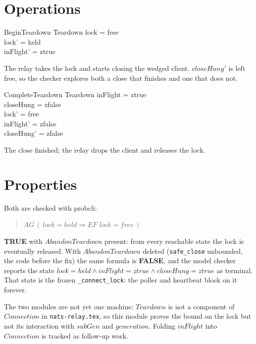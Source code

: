 \documentclass[a4paper,10pt,fleqn]{article}
\begin{document}
\section{Operations}

\begin{schema}{BeginTeardown}
  \Delta Teardown
  \where
  lock = free \\
  lock' = held \\
  inFlight' = ztrue
\end{schema}

The relay takes the lock and starts closing the wedged client.
$closeHung'$ is left free, so the checker explores both a close that
finishes and one that does not.

\begin{schema}{CompleteTeardown}
  \Delta Teardown
  \where
  inFlight = ztrue \\
  closeHung = zfalse \\
  lock' = free \\
  inFlight' = zfalse \\
  closeHung' = zfalse
\end{schema}

The close finished; the relay drops the client and releases the lock.

\section{Properties}

Both are checked with probcli:

\begin{quote}
  $AG\,(\,lock = held \Rightarrow EF\;lock = free\,)$
\end{quote}

\textbf{TRUE} with $AbandonTeardown$ present: from every reachable state
the lock is eventually released.  With $AbandonTeardown$ deleted
(\texttt{safe\_close} unbounded, the code before the fix) the same formula
is \textbf{FALSE}, and the model checker reports the state $lock = held \land inFlight = ztrue \land
closeHung = ztrue$ as terminal.  That state is the frozen
\texttt{\_connect\_lock}: the poller and heartbeat block on it forever.

The two modules are not yet one machine: $Teardown$ is not a component of
$Connection$ in \texttt{nats-relay.tex}, so this module proves the bound on
the lock but not its interaction with $subGen$ and $generation$.  Folding
$inFlight$ into $Connection$ is tracked as follow-up work.
\end{document}
